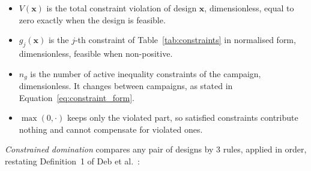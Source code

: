 \begin{itemize}
  \item $V(\mathbf{x})$ is the total constraint violation of design
        $\mathbf{x}$, dimensionless, equal to zero exactly when the
        design is feasible.

  \item $g_j(\mathbf{x})$ is the $j$-th constraint of
        Table~\ref{tab:constraints} in normalised form, dimensionless,
        feasible when non-positive.

  \item $n_g$ is the number of active inequality constraints of the
        campaign, dimensionless. It changes between campaigns, as stated
        in Equation~\eqref{eq:constraint_form}.

  \item $\max(0, \cdot)$ keeps only the violated part, so satisfied
        constraints contribute nothing and cannot compensate for
        violated ones.
\end{itemize}

\emph{Constrained domination} compares any pair of designs by 3
rules, applied in order, restating Definition~1 of
Deb et al.~\cite{deb_nsga2_2002}:

